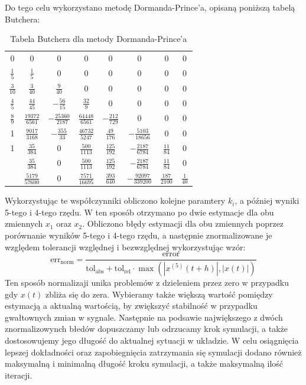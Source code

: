 \documentclass[a4paper]{article}
\begin{document}
Do tego celu wykorzystano metodę Dormanda-Prince'a, opisaną poniższą tabelą Butchera:
\renewcommand{\arraystretch}{1.25}
\begin{table}[h]
    \centering
    \begin{tabular}{c|ccccccc}
    0 & 0 & 0 & 0 & 0 & 0 & 0 & 0 \\
    $\frac{1}{5}$ & $\frac{1}{5}$ & 0 & 0 & 0 & 0 & 0 & 0 \\
    $\frac{3}{10}$ & $\frac{3}{40}$ & $\frac{9}{40}$ & 0 & 0 & 0 & 0 & 0 \\
    $\frac{4}{5}$ & $\frac{44}{45}$ & $-\frac{56}{15}$ & $\frac{32}{9}$ & 0 & 0 & 0 & 0 \\
    $\frac{8}{9}$ & $\frac{19372}{6561}$ & $-\frac{25360}{2187}$ & $\frac{64448}{6561}$ & $-\frac{212}{729}$ & 0 & 0 & 0 \\
    1 & $\frac{9017}{3168}$ & $-\frac{355}{33}$ & $\frac{46732}{5247}$ & $\frac{49}{176}$ & $-\frac{5103}{18656}$ & 0 & 0 \\
    1 & $\frac{35}{384}$ & 0 & $\frac{500}{1113}$ & $\frac{125}{192}$ & $-\frac{2187}{6784}$ & $\frac{11}{84}$ & 0 \\
    \hline
    & $\frac{35}{384}$ & 0 & $\frac{500}{1113}$ & $\frac{125}{192}$ & $-\frac{2187}{6784}$ & $\frac{11}{84}$ & 0 \\
    & $\frac{5179}{57600}$ & 0 & $\frac{7571}{16695}$ & $\frac{393}{640}$ & $-\frac{92097}{339200}$ & $\frac{187}{2100}$ & $\frac{1}{40}$
    \end{tabular}
    \caption{Tabela Butchera dla metody Dormanda-Prince'a}
\end{table}
Wykorzystując te współczynniki obliczono kolejne paramtery $k_i$, a później wyniki 5-tego i 4-tego rzędu. W ten sposób otrzymano po dwie estymacje dla obu zmiennych $x_1$ oraz $x_2$.
Obliczono błędy estymacji dla obu zmiennych poprzez porównanie wyników 5-tego i 4-tego rzędu, a następnie znormalizowane je względem tolerancji względnej i bezwzględnej wykorzystując wzór:
\begin{equation*}
    \text{err}_{\text{norm}} = \frac{\text{error}}{\text{tol}_{\text{abs}} + \text{tol}_{\text{rel}} \cdot \max(|x^{(5)}(t+h)|, |x(t)|)}
\end{equation*}
Ten sposób normalizaji unika problemów z dzieleniem przez zero w przypadku gdy $x(t)$ zbliża się do zera. Wybieramy także większą wartość pomiędzy estymacją a aktualną wartością, by zwiększyć
stabilność w przypadku gwałtownych zmian w sygnale. Następnie na podsawie największego z dwóch znormalizowynch błedów dopuszczamy lub odrzucamy krok symulacji, a także dostosowujemy jego długość do aktualnej sytuacji w układzie.
W celu osiągnięcia lepszej dokładności oraz zapobiegnięcia zatrzymania się symulacji dodano również maksymalną i minimalną długość kroku symulacji, a także maksymalną ilość iteracji.
\end{document}
